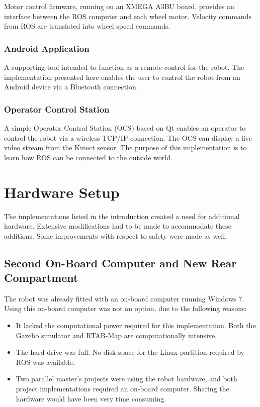 Motor control firmware, running on an XMEGA A3BU board, provides an interface between the \ac{ROS} computer and each wheel motor. Velocity commands from \ac{ROS} are translated into wheel speed commands.

\subsubsection{Android Application}
A supporting tool intended to function as a remote control for the robot. The implementation presented here enables the user to control the robot from an Android device via a Bluetooth connection.

\subsubsection{Operator Control Station}

A simple Operator Control Station (OCS) based on Qt enables an operator to control the robot via a wireless TCP/IP connection. The \ac{OCS} can display a live video stream from the Kinect sensor. The purpose of this implementation is to learn how \ac{ROS} can be connected to the outside world.

\section{Hardware Setup}

The implementations listed in the introduction created a need for additional hardware. Extensive modifications had to be made to accommodate these additions. Some improvements with respect to safety were made as well.

\subsection{Second On-Board Computer and New Rear Compartment}

The robot was already fitted with an on-board computer running Windows 7. Using this on-board computer was not an option, due to the following reasons:
\begin{itemize}
\item It lacked the computational power required for this implementation. Both the Gazebo simulator and \ac{RTAB-Map} are computationally intensive.
\item The hard-drive was full. No disk space for the Linux partition required by \ac{ROS} was available.
\item Two parallel master's projects were using the robot hardware, and both project implementations required an on-board computer. Sharing the hardware would have been very time consuming.
\end{itemize} 

